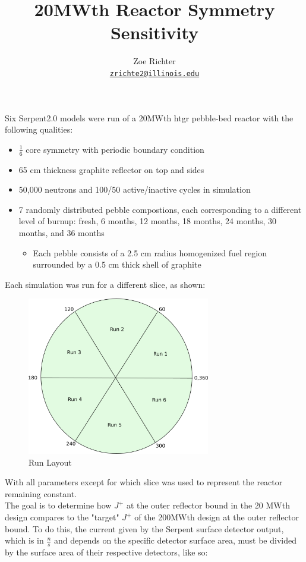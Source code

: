 \documentclass[letterpaper]{article}
\author{Zoe Richter
        \\ \href{mailto:zrichte2@illinois.edu}{\texttt{zrichte2@illinois.edu}}
}
\title{20MWth Reactor Symmetry Sensitivity}
\begin{document}
\maketitle

Six Serpent2.0 models were run of a 20MWth htgr pebble-bed reactor with the following qualities:
\begin{itemize}
	\item $\frac{1}{6}$ core symmetry with periodic boundary condition
	\item 65 cm thickness graphite reflector on top and sides
	\item 50,000 neutrons and 100/50 active/inactive cycles in simulation
	\item 7 randomly distributed pebble compostions, each corresponding to a different level of burnup: fresh, 6 months, 12 months, 18 months, 24 months, 30 months, and 36 months
		\begin{itemize}
			\item Each pebble consists of a 2.5 cm radius homogenized fuel region surrounded by a 0.5 cm thick shell of graphite
		\end{itemize}
\end{itemize}

Each simulation was run for a different slice, as shown:

\begin{figure}[H]
\centerline{\includegraphics[width=8cm,keepaspectratio]{run-layout.png}}
\caption{Run Layout}
\label{layout}
\end{figure}

With all parameters except for which slice was used to represent the reactor remaining constant.
\\
The goal is to determine how $J^+$ at the outer reflector bound in the 20 MWth design compares to the "target" $J^+$ of the 200MWth design at the outer reflector bound.  To do this, the current given by the Serpent surface detector output, which is in $\frac{n}{s}$ and depends on the specific detector surface area, must be divided by the surface area of their respective detectors, like so:
\end{document}
